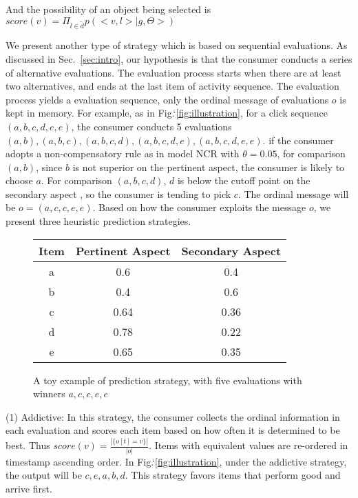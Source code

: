 \documentclass[sigconf]{acmart}
\begin{document}
And the possibility of an object being selected is $score(v)=\Pi_{l \in \tilde{d}} p(<v, l>|g,\Theta>)$ 


We present another type of strategy which is based on sequential evaluations. As discussed in Sec.~\ref{sec:intro}, our hypothesis is that the consumer conducts a series of alternative evaluations. The evaluation process starts when there are at least two alternatives, and ends at the last item of activity sequence. The evaluation process yields a evaluation sequence, only the ordinal message of evaluations $o$ is kept in memory. For example, as in Fig.`\ref{fig:illustration}, for a click sequence $(a,b,c,d,e,e)$, the consumer conducts 5 evaluations $(a,b), (a,b,c),(a,b,c,d),(a,b,c,d,e),(a,b,c,d,e,e) $. if the consumer adopts a non-compensatory rule as in model NCR with $\theta=0.05$, for comparison $(a,b)$, since $b$ is not superior on the pertinent aspect, the consumer is likely to choose $a$. For comparison $(a,b,c,d)$,  $d$ is below the cutoff point on the secondary aspect , so the consumer is tending to pick $c$. The ordinal message will be $o=(a,c,c,e,e)$. Based on how the consumer exploits the message $o$, we present three heuristic prediction strategies.


\begin{figure}[htbp]
\begin{center}
\begin{tabular}{|c|c|c|}
\hline
Item & Pertinent Aspect & Secondary Aspect \\\hline
a & 0.6 & 0.4 \\
b & 0.4 & 0.6  \\
c & 0.64 & 0.36 \\
d & 0.78 & 0.22 \\
e & 0.65 & 0.35 \\\hline
\end{tabular}
\caption{A toy example of prediction strategy, with five evaluations with winners $a,c,c,e,e$}
\label{default}
\end{center}
\end{figure}\label{fig:illustration}

(1) Addictive: In this strategy, the consumer collects the ordinal information in each evaluation and scores each item based on how often it is determined to be best. Thus $score(v)=\frac{|\{o[t] = v\}|}{|o|}$. Items with equivalent values are re-ordered in timestamp ascending order. In Fig.`\ref{fig:illustration},  under the addictive strategy, the output will be $c,e,a,b,d$. This strategy favors items that perform good and arrive first.
\end{document}
